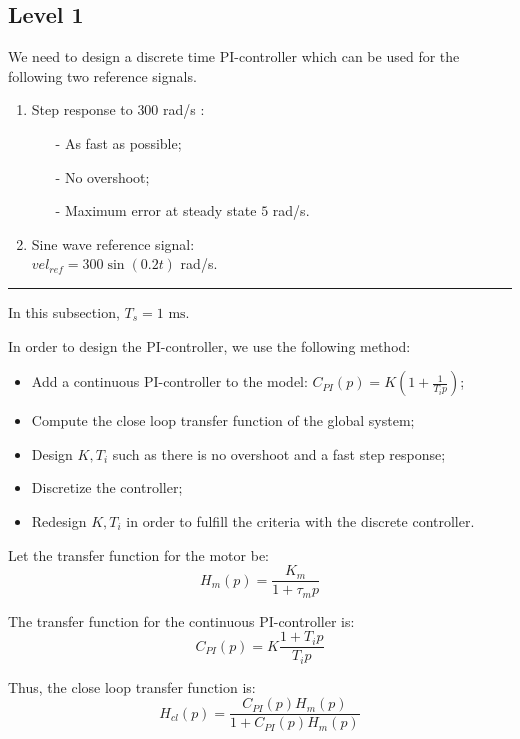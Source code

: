 \subsection*{Level 1}


We need to design a discrete time PI-controller which can be used for the following two reference signals.

\begin{enumerate}
 \item Step response to $300$ rad/s :
 \begin{itemize}
  \item[-] As fast as possible;
  \item[-] No overshoot;
  \item[-] Maximum error at steady state $5$ rad/s.
 \end{itemize}
  \item Sine wave reference signal: \\ $vel_{ref} = 300 \sin(0.2t)$ rad/s.
\end{enumerate}

\begin{center} \noindent\rule{6cm}{0.1pt} \end{center}

In this subsection, $T_s = 1 \text{ ms}$.

In order to design the PI-controller, we use the following method:
\begin{itemize}
 \item Add a continuous PI-controller to the model: $C_{PI}(p) = K(1 + \frac{1}{T_i p})$;
 \item Compute the close loop transfer function of the global system;
 \item Design $K,T_i$ such as there is no overshoot and a fast step response;
 \item Discretize the controller;
 \item Redesign $K,T_i$ in order to fulfill the criteria with the discrete controller.
\end{itemize}

Let the transfer function for the motor be: $$H_{m}(p) = \frac{K_{m}}{1 + \tau_{m} p}$$

The transfer function for the continuous PI-controller is: $$C_{PI}(p) = K\frac{1 + T_i p}{T_i p}$$

Thus, the close loop transfer function is: \begin{equation} \label{eq1} H_{cl}(p) = \frac{C_{PI}(p) H_{m}(p)}{1 + C_{PI}(p) H_{m}(p)} \end{equation}

